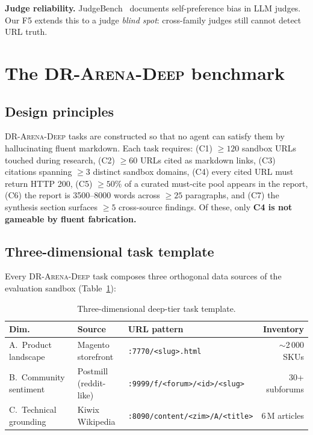 \documentclass[11pt]{article}
\begin{document}
\textbf{Judge reliability.} JudgeBench~\citep{judgebench2025} documents
self-preference bias in LLM judges. Our F5 extends this to a judge
\emph{blind spot}: cross-family judges still cannot detect URL truth.

\section{The \textsc{DR-Arena-Deep} benchmark}
\label{sec:dataset}

\subsection{Design principles}
\label{sec:design}

\textsc{DR-Arena-Deep} tasks are constructed so that no agent can satisfy
them by hallucinating fluent markdown. Each task requires:
(C1) $\geq 120$ sandbox URLs touched during research,
(C2) $\geq 60$ URLs cited as markdown links,
(C3) citations spanning $\geq 3$ distinct sandbox domains,
(C4) every cited URL must return HTTP 200,
(C5) $\geq 50\%$ of a curated must-cite pool appears in the report,
(C6) the report is 3500--8000 words across $\geq 25$ paragraphs, and
(C7) the synthesis section surfaces $\geq 5$ cross-source findings.
Of these, only \textbf{C4 is not gameable by fluent fabrication.}

\subsection{Three-dimensional task template}

Every \textsc{DR-Arena-Deep} task composes three orthogonal data sources
of the evaluation sandbox (Table~\ref{tab:dims}):

\begin{table}[ht]
\centering
\caption{Three-dimensional deep-tier task template.}
\label{tab:dims}
\begin{tabularx}{\linewidth}{l l X r}
\toprule
\textbf{Dim.} & \textbf{Source} & \textbf{URL pattern} & \textbf{Inventory} \\
\midrule
A.~Product landscape & Magento storefront  & \texttt{:7770/<slug>.html} & $\sim$2\,000 SKUs \\
B.~Community sentiment & Postmill (reddit-like) & \texttt{:9999/f/<forum>/<id>/<slug>} & 30+ subforums \\
C.~Technical grounding & Kiwix Wikipedia & \texttt{:8090/content/<zim>/A/<title>} & 6\,M articles \\
\bottomrule
\end{tabularx}
\end{table}
\end{document}
